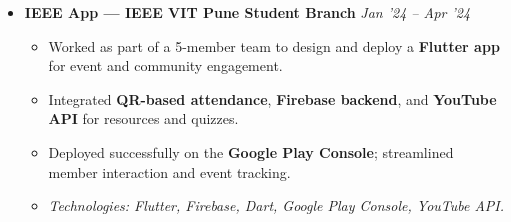 \documentclass{article}
\begin{document}
\begin{itemize}[itemsep=1pt, topsep=1pt]
\item \textbf{IEEE App — IEEE VIT Pune Student Branch} 
\hfill \emph{Jan '24 – Apr '24}
\begin{itemize}
    \item Worked as part of a 5-member team to design and deploy a \textbf{Flutter app} for event and community engagement.  
    \item Integrated \textbf{QR-based attendance}, \textbf{Firebase backend}, and \textbf{YouTube API} for resources and quizzes.  
    \item Deployed successfully on the \textbf{Google Play Console}; streamlined member interaction and event tracking.  
    \item \textit{Technologies: Flutter, Firebase, Dart, Google Play Console, YouTube API.}  
\end{itemize}
\end{itemize}





          
\end{document}
